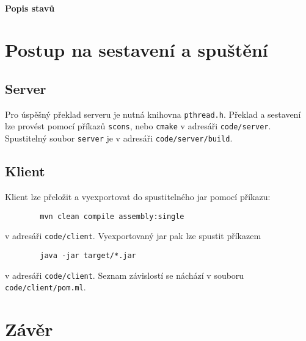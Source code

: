 \documentclass[11pt,a4paper]{scrartcl}
\begin{document}
	\paragraph{Popis stavů}
	

		
	\section{Postup na sestavení a spuštění}
	\subsection{Server}
	Pro úspěšný překlad serveru je nutná knihovna \verb|pthread.h|. Překlad a sestavení lze provést pomocí příkazů \verb|scons|, nebo \verb|cmake| v adresáři \verb|code/server|. Spustitelný soubor \verb|server| je v adresáři \verb|code/server/build|.
	\subsection{Klient}
	Klient lze přeložit a vyexportovat do spustitelného jar pomocí příkazu:
	\begin{lstlisting}
		mvn clean compile assembly:single
	\end{lstlisting}
	v adresáři \verb|code/client|. Vyexportovaný jar pak lze spustit příkazem
	\begin{lstlisting}
		java -jar target/*.jar
	\end{lstlisting} v adresáři \verb|code/client|. Seznam závislostí se náchází v souboru \verb|code/client/pom.ml|.
		
	\section{Závěr}
	
	
\end{document}
